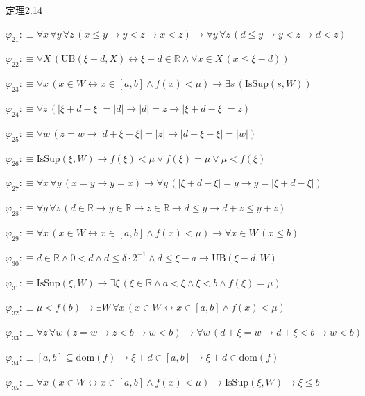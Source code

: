 \begin{fullproof}{定理2.14}
\begin{abbrevlist}
\item $\varphi_{21} :\equiv \forall x\,\forall y\,\forall z\,(x \leq y \to y < z \to x < z) \to \forall y\,\forall z\,(d \leq y \to y < z \to d < z)$
\item $\varphi_{22} :\equiv \forall X\,(\mathrm{UB}(\xi - d,X) \leftrightarrow \xi - d \in \mathbb{R} \land \forall x \in X\,(x \leq \xi - d))$
\item $\varphi_{23} :\equiv \forall x\,(x \in W \leftrightarrow x \in [a,b] \land f(x) < \mu) \to \exists s\,(\mathrm{IsSup}(s,W))$
\item $\varphi_{24} :\equiv \forall z\,(\lvert \xi + d - \xi \rvert = \lvert d \rvert \to \lvert d \rvert = z \to \lvert \xi + d - \xi \rvert = z)$
\item $\varphi_{25} :\equiv \forall w\,(z = w \to \lvert d + \xi - \xi \rvert = \lvert z \rvert \to \lvert d + \xi - \xi \rvert = \lvert w \rvert)$
\item $\varphi_{26} :\equiv \mathrm{IsSup}(\xi,W) \to f(\xi) < \mu \lor f(\xi) = \mu \lor \mu < f(\xi)$
\item $\varphi_{27} :\equiv \forall x\,\forall y\,(x = y \to y = x) \to \forall y\,(\lvert \xi + d - \xi \rvert = y \to y = \lvert \xi + d - \xi \rvert)$
\item $\varphi_{28} :\equiv \forall y\,\forall z\,(d \in \mathbb{R} \to y \in \mathbb{R} \to z \in \mathbb{R} \to d \leq y \to d + z \leq y + z)$
\item $\varphi_{29} :\equiv \forall x\,(x \in W \leftrightarrow x \in [a,b] \land f(x) < \mu) \to \forall x \in W\,(x \leq b)$
\item $\varphi_{30} :\equiv d \in \mathbb{R} \land 0 < d \land d \leq \delta \cdot 2^{-1} \land d \leq \xi - a \to \mathrm{UB}(\xi - d,W)$
\item $\varphi_{31} :\equiv \mathrm{IsSup}(\xi,W) \to \exists \xi\,(\xi \in \mathbb{R} \land a < \xi \land \xi < b \land f(\xi) = \mu)$
\item $\varphi_{32} :\equiv \mu < f(b) \to \exists W\,\forall x\,(x \in W \leftrightarrow x \in [a,b] \land f(x) < \mu)$
\item $\varphi_{33} :\equiv \forall z\,\forall w\,(z = w \to z < b \to w < b) \to \forall w\,(d + \xi = w \to d + \xi < b \to w < b)$
\item $\varphi_{34} :\equiv [a,b] \subseteq \mathrm{dom}(f) \to \xi + d \in [a,b] \to \xi + d \in \mathrm{dom}(f)$
\item $\varphi_{35} :\equiv \forall x\,(x \in W \leftrightarrow x \in [a,b] \land f(x) < \mu) \to \mathrm{IsSup}(\xi,W) \to \xi \leq b$

\end{abbrevlist}
\end{fullproof}

